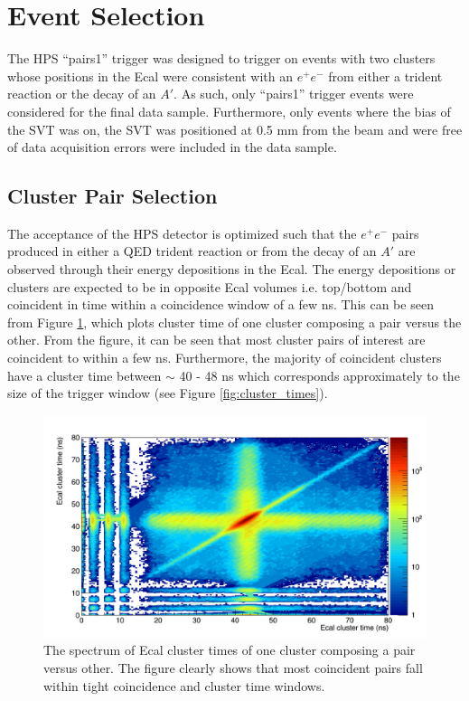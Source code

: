\section{Event Selection}

The HPS ``pairs1'' trigger was designed to trigger on events with two clusters
whose positions in the Ecal were consistent with an $e^+e^-$ from either a trident 
reaction or the decay of an $A'$. As such, only ``pairs1'' trigger events
were considered for the final data sample.  Furthermore, only events where the
bias of the SVT was on, the SVT was positioned at 0.5 mm from the beam and 
were free of data acquisition errors were included in the data sample.

\subsection{Cluster Pair Selection}

The acceptance of the HPS detector is optimized such that the $e^+e^-$ pairs
produced in either a QED trident reaction or from the decay of an 
$A'$ are observed through their energy depositions in the Ecal.  The energy
depositions or clusters are expected to be in opposite Ecal volumes i.e. 
top/bottom and coincident in time within a coincidence window of a few ns.  This
can be seen from Figure \ref{fig:cluster_times_2d}, which plots  
cluster time of one cluster composing a pair versus the 
other.  From the figure, it can be seen that most cluster pairs of interest are 
coincident to within a few ns. Furthermore, the majority of coincident clusters
have a cluster time between $\sim$ 40 - 48 ns which corresponds approximately
to the size of the trigger window (see Figure \ref{fig:cluster_times}). 
\begin{figure}[t]
    \centering
    \includegraphics[width=\textwidth]{images/20160428_pass4_cluster_time_v_cluster_time.png}
    \caption{The spectrum of Ecal cluster times of one cluster composing a pair 
             versus other.  The figure clearly shows that most coincident pairs 
             fall within tight coincidence and cluster time windows.}
    \label{fig:cluster_times_2d}
\end{figure}  

